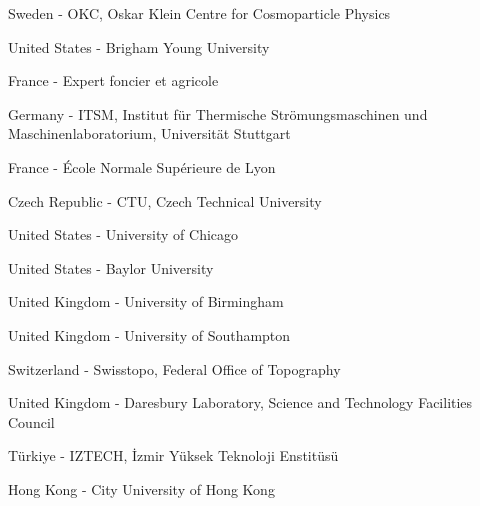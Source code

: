 \item[$^{414}$] Sweden - OKC, Oskar Klein Centre for Cosmoparticle Physics
\item[$^{415}$] United States - Brigham Young University
\item[$^{416}$] France - Expert foncier et agricole
\item[$^{417}$] Germany - ITSM, Institut f{\"u}r Thermische Str{\"o}mungsmaschinen und Maschinenlaboratorium, Universit{\"a}t Stuttgart
\item[$^{418}$] France - {\'E}cole Normale Sup{\'e}rieure de Lyon
\item[$^{419}$] Czech Republic - CTU, Czech Technical University
\item[$^{420}$] United States - University of Chicago
\item[$^{421}$] United States - Baylor University
\item[$^{422}$] United Kingdom - University of Birmingham
\item[$^{423}$] United Kingdom - University of Southampton
\item[$^{424}$] Switzerland - Swisstopo, Federal Office of Topography
\item[$^{425}$] United Kingdom - Daresbury Laboratory, Science and Technology Facilities Council
\item[$^{426}$] T{\"u}rkiye - IZTECH, {\.{I}}zmir Y{\"u}ksek Teknoloji Enstit{\"u}s{\"u}
\item[$^{427}$] Hong Kong - City University of Hong Kong